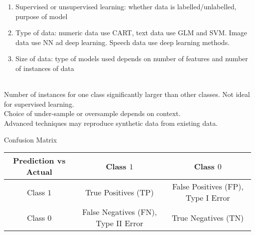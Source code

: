 \begin{remark} 
\begin{enumerate}[label=\roman*.]
\setlength{\itemsep}{0pt}
\item Supervised or unsupervised learning: whether data is labelled/unlabelled, purpose of model
\item Type of data: numeric data use CART, text data use GLM and SVM. Image data use NN ad deep learning. Speech data use deep learning methods.
\item Size of data: type of models used depends on number of features and number of instances of data
\end{enumerate}
\end{remark}

\begin{definition} \\
Number of instances for one class significantly larger than other classes. Not ideal for supervised learning.\\
Choice of under-sample or oversample depends on context.\\
Advanced techniques may reproduce synthetic data from existing data.
\end{definition}

\begin{flushleft}
Confusion Matrix\\
\begin{tabular}{|c|c|c|}
\hline
\rowcolor{gray!30}
Prediction vs Actual & Class $1$ & Class $0$ \\
\hline
Class $1$ & True Positives (TP) & False Positives (FP), Type I Error\\
\hline
Class $0$ & False Negatives (FN), Type II Error & True Negatives (TN)\\
\hline
\end{tabular}
\end{flushleft}

